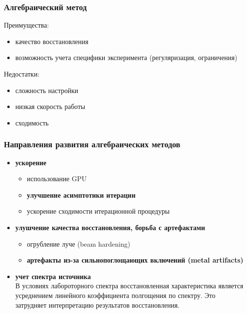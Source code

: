 \begin{frame}
\frametitle{Алгебраический метод}

Преимущества:\\
\begin{itemize}
  \item качество восстановления
  \item возможность учета специфики эксперимента (регуляризация, ограничения)
\end{itemize}
\vspace{1.5cm}

Недостатки:\\
\begin{itemize}
  \item сложность настройки
  \item низкая скорость работы
  \item сходимость
\end{itemize}
\end{frame}

\begin{frame}
\frametitle{Направления развития алгебраических методов}

\begin{itemize}
  \item \textbf{ускорение}
  \begin{itemize}
    \item использование GPU
    \item \textbf{улучшение асимптотики итерации}
    \item ускорение сходимости итерационной процедуры
  \end{itemize}
  \item \textbf{улушчение качества восстановления, борьба с артефактами}
    \begin{itemize}
    \item огрубление луче (beam hardening)
    \item \textbf{артефакты из-за сильнопоглощающих включений (metal artifacts)}
    \end{itemize}
  \item \textbf{учет спектра источника} \\
  \small{В условиях лабороторного спектра восстановленная характеристика является усреднением линейного коэффициента полгощения по спектру. Это затрудняет интерпретацию результатов восстановления. }
\end{itemize}

\end{frame}